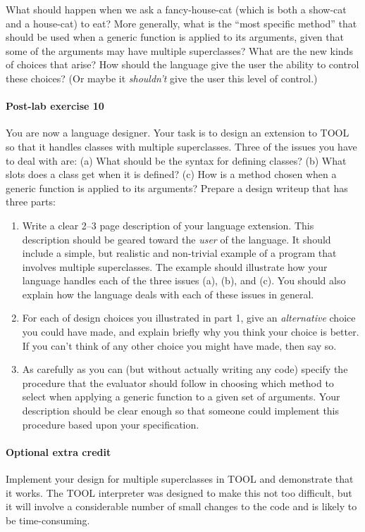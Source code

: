 \noindent What should happen when we ask a fancy-house-cat (which is
both a show-cat and a house-cat) to eat?  More generally, what is the
``most specific method'' that should be used when a generic function
is applied to its arguments, given that some of the arguments may have
multiple superclasses?  What are the new kinds of choices that arise?
How should the language give the user the ability to control these
choices?  (Or maybe it {\it shouldn't} give the user this level of
control.)

\paragraph{Post-lab exercise 10} You are now a language designer.
Your task is to design an extension to TOOL so that it handles
classes with multiple superclasses.  Three of the issues you have to
deal with are: (a) What should be the syntax for defining classes?
(b) What slots does a class get when it is defined?  (c) How is a
method chosen when a generic function is applied to its arguments?
Prepare a design writeup that has three parts:

\begin{enumerate}

\item Write a clear 2--3 page description of your language extension.
This description should be geared toward the {\it user} of the
language.  It should include a simple, but realistic and non-trivial
example of a program that involves multiple superclasses.  The
example should illustrate how your language handles each of the
three issues (a), (b), and (c).  You should also explain how the
language deals with each of these issues in general.

\item For each of design choices you illustrated in part 1, give an
{\it alternative} choice you could have made, and explain briefly why
you think your choice is better.  If you can't think of any other
choice you might have made, then say so.

\item As carefully as you can (but without actually writing any code)
specify the procedure that the evaluator should follow in choosing
which method to select when applying a generic function to a given
set of arguments.  Your description should be clear enough so that
someone could implement this procedure based upon your specification.

\end{enumerate}

\paragraph{Optional extra credit}  Implement your design for multiple
superclasses in TOOL and demonstrate that it works.  The TOOL
interpreter was designed to make this not too difficult, but it will
involve a considerable number of small changes to the code and is
likely to be time-consuming.



